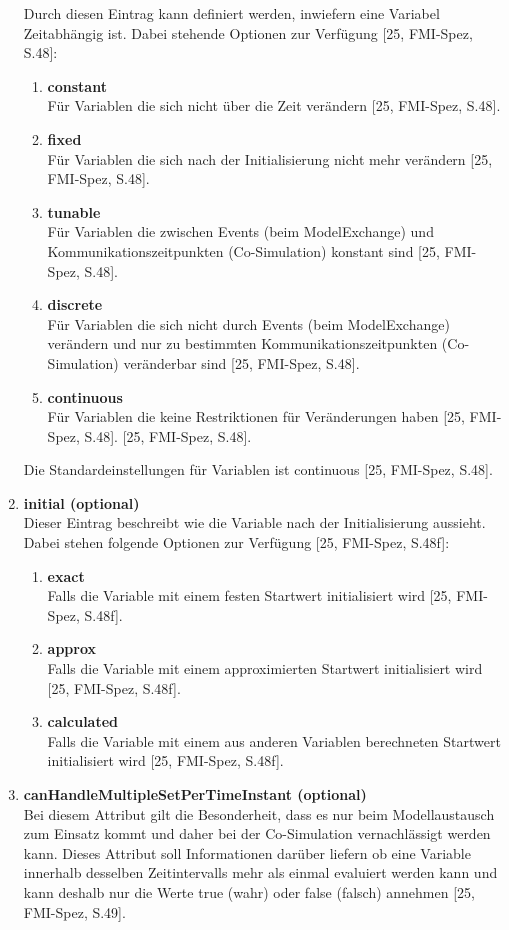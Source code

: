 \begin{enumerate}
	Durch diesen Eintrag kann definiert werden, inwiefern eine Variabel Zeitabhängig ist. Dabei
	stehende Optionen zur Verfügung [25, FMI-Spez, S.48]:
		\begin{enumerate}
		\item \textbf{constant} \\
		Für Variablen die sich nicht über die Zeit verändern [25, FMI-Spez, S.48].
		\item \textbf{fixed} \\
		Für Variablen die sich nach der Initialisierung nicht mehr verändern
		[25, FMI-Spez, S.48].
		\item \textbf{tunable} \\
		Für Variablen die zwischen Events (beim ModelExchange) und
		Kommunikationszeitpunkten (Co-Simulation) konstant sind [25, FMI-Spez, S.48].
		\item \textbf{discrete} \\
		Für Variablen die sich nicht durch Events (beim ModelExchange)
		verändern und nur zu bestimmten Kommunikationszeitpunkten (Co-Simulation) veränderbar
		sind [25, FMI-Spez, S.48].
		\item \textbf{continuous} \\
		Für Variablen die keine Restriktionen für Veränderungen haben
		[25, FMI-Spez, S.48]. [25, FMI-Spez, S.48].
		\end{enumerate}
	Die Standardeinstellungen für Variablen ist continuous [25, FMI-Spez, S.48].
	\item \textbf{initial (optional)} \\
	Dieser Eintrag beschreibt wie die Variable nach der Initialisierung aussieht. Dabei stehen
	folgende Optionen zur Verfügung [25, FMI-Spez, S.48f]:
	\begin{enumerate}
		\item \textbf{exact} \\
		Falls die Variable mit einem festen Startwert initialisiert wird [25, FMI-Spez, S.48f].
		\item \textbf{approx} \\
		Falls die Variable mit einem approximierten Startwert initialisiert wird
		[25, FMI-Spez, S.48f].
		\item \textbf{calculated} \\
		Falls die Variable mit einem aus anderen Variablen berechneten
		Startwert initialisiert wird [25, FMI-Spez, S.48f].
		\end{enumerate}
	\item \textbf{canHandleMultipleSetPerTimeInstant (optional)} \\
	Bei diesem Attribut gilt die Besonderheit, dass es nur beim Modellaustausch zum Einsatz
	kommt und daher bei der Co-Simulation vernachlässigt werden kann. Dieses Attribut soll 
	Informationen darüber liefern ob eine Variable innerhalb desselben Zeitintervalls mehr als 
	einmal evaluiert werden kann und kann deshalb nur die Werte true (wahr) oder false (falsch) 
	annehmen [25, FMI-Spez, S.49].
\end{enumerate}
